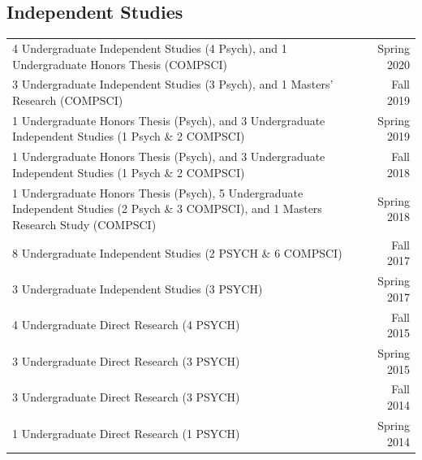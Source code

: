 \documentclass[a4paper,10pt]{article}
\begin{document}
\subsection{Independent Studies}
\begin{tabu}{Xr}
4 Undergraduate Independent Studies (4 Psych), and 1 Undergraduate Honors Thesis (COMPSCI) & Spring 2020 \\
3 Undergraduate Independent Studies (3 Psych), and 1 Masters' Research (COMPSCI) & Fall 2019 \\
1 Undergraduate Honors Thesis (Psych), and 3 Undergraduate Independent Studies (1 Psych \& 2 COMPSCI) & Spring 2019 \\
1 Undergraduate Honors Thesis (Psych), and 3 Undergraduate Independent Studies (1 Psych \& 2 COMPSCI) & Fall 2018 \\
1 Undergraduate Honors Thesis (Psych), 5 Undergraduate Independent Studies (2 Psych \& 3 COMPSCI), and 1 Masters Research Study (COMPSCI) & Spring 2018 \\
8 Undergraduate Independent Studies (2 PSYCH \& 6 COMPSCI) & Fall 2017 \\
3 Undergraduate Independent Studies (3 PSYCH) & Spring 2017 \\
4 Undergraduate Direct Research (4 PSYCH) & Fall 2015 \\ 
3 Undergraduate Direct Research (3 PSYCH) & Spring 2015 \\ 
3 Undergraduate Direct Research (3 PSYCH) & Fall 2014 \\
1 Undergraduate Direct Research (1 PSYCH) & Spring 2014
\end{tabu}



\end{document}
